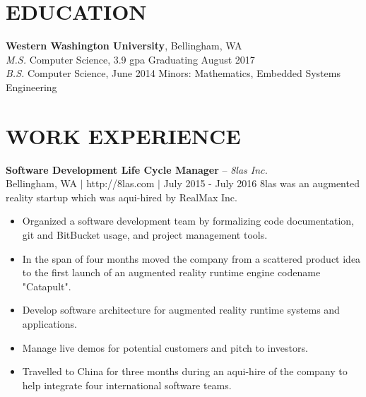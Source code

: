 \documentclass[line,margin]{res}
\begin{document}
\address{425.241.7977 $|$ kyle@kylerader.ninja $|$ https://kylerader.ninja $|$ github.com/kyle-rader}

\begin{resume}

\section{EDUCATION}
    {\bf Western Washington University}, Bellingham, WA \\
    {\sl M.S.} Computer Science, 3.9 gpa {\small Graduating August 2017} \\
    {\sl B.S.} Computer Science, {\small June 2014} Minors: Mathematics, Embedded Systems Engineering

\section{WORK EXPERIENCE}



    {\bf Software Development Life Cycle Manager} -- {\sl 8las Inc.} \\
    {\footnotesize Bellingham, WA $|$ http://8las.com $|$ July 2015 - July 2016}
    8las was an augmented reality startup which was aqui-hired by RealMax Inc.
    \begin{itemize} \itemsep -2pt
        \item Organized a software development team by formalizing code documentation,
            git and BitBucket usage, and project management tools.
        \item In the span of four months moved the company from a scattered product idea to the first launch of an augmented reality runtime engine codename "Catapult".
        \item Develop software architecture for augmented reality runtime systems and applications.
        \item Manage live demos for potential customers and pitch to investors.
        \item Travelled to China for three months during an aqui-hire of the company to help integrate four international software teams.
    \end{itemize}


\end{resume}
\end{document}
